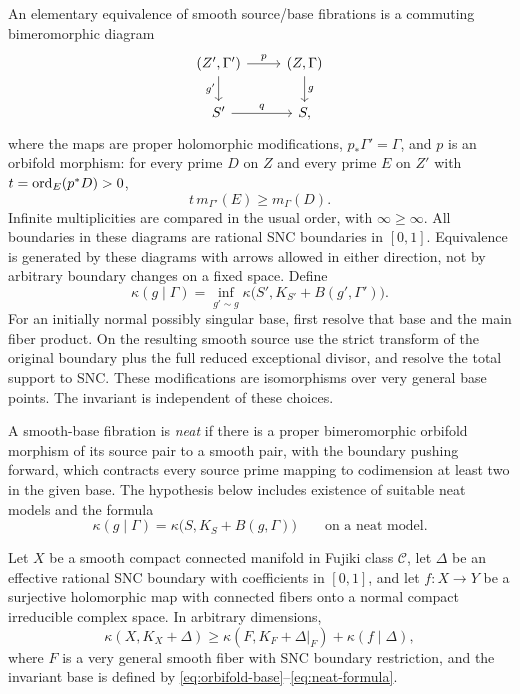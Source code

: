 An elementary equivalence of smooth source/base fibrations is a
commuting bimeromorphic diagram
\[
\begin{tikzcd}
 (Z',\Gamma')\arrow[r,"p"]\arrow[d,"g'"']&
 (Z,\Gamma)\arrow[d,"g"]\\
 S'\arrow[r,"q"]&S,
\end{tikzcd}
\]
where the maps are proper holomorphic modifications,
\(p_*\Gamma'=\Gamma\), and \(p\) is an orbifold morphism: for
every prime \(D\) on \(Z\) and every prime \(E\) on \(Z'\) with
\(t=\operatorname{ord}_E(p^*D)>0\),
\begin{equation}\label{eq:orbifold-morphism}
 t\,m_{\Gamma'}(E)\ge m_\Gamma(D).
\end{equation}
Infinite multiplicities are compared in the usual order, with
\(\infty\ge\infty\). All boundaries in these diagrams are rational
SNC boundaries in \([0,1]\). Equivalence is generated by these
diagrams with arrows allowed in either direction, not by arbitrary
boundary changes on a fixed space. Define
\begin{equation}\label{eq:orbifold-invariant}
 \kappa(g\mid\Gamma)=
 \inf_{g'\sim g}\kappa\bigl(S',K_{S'}+B(g',\Gamma')\bigr).
\end{equation}
For an initially normal possibly singular base, first resolve that
base and the main fiber product. On the resulting smooth source use
the strict transform of the original boundary plus the full reduced
exceptional divisor, and resolve the total support to SNC. These
modifications are isomorphisms over very general base points. The
invariant is independent of these choices.

A smooth-base fibration is \emph{neat} if there is a proper
bimeromorphic orbifold morphism of its source pair to a smooth pair,
with the boundary pushing forward, which contracts every source prime
mapping to codimension at least two in the given base. The hypothesis
below includes existence of suitable neat models and the formula
\begin{equation}\label{eq:neat-formula}
 \kappa(g\mid\Gamma)=\kappa\bigl(S,K_S+B(g,\Gamma)\bigr)
 \qquad\text{on a neat model}.
\end{equation}

\begin{assumption}
\label{hyp:campana}
Let \(X\) be a smooth compact connected manifold in Fujiki class
\(\mathcal C\), let \(\Delta\) be an effective rational SNC
boundary with coefficients in \([0,1]\), and let \(f:X\to Y\) be
a surjective holomorphic map with connected fibers onto a normal
compact irreducible complex space. In arbitrary dimensions,
\begin{equation}\label{eq:campana}
 \kappa(X,K_X+\Delta)\ge
 \kappa(F,K_F+\Delta|_F)+\kappa(f\mid\Delta),
\end{equation}
where \(F\) is a very general smooth fiber with SNC boundary
restriction, and the invariant base is defined by
\eqref{eq:orbifold-base}--\eqref{eq:neat-formula}.
\end{assumption}

